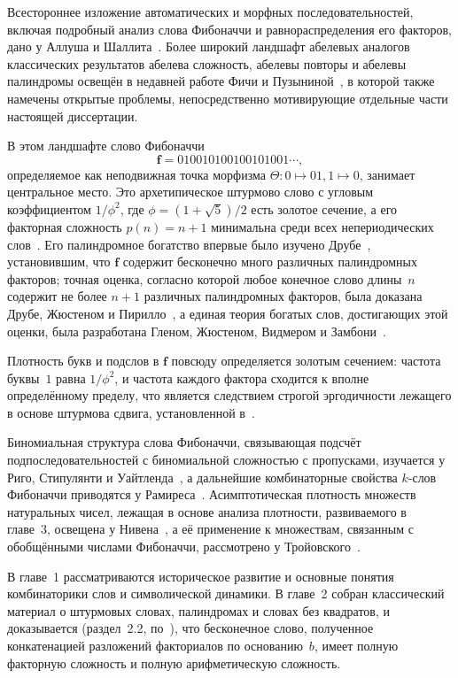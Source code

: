 \documentclass[a4paper,14pt]{extreport}
\theoremstyle{plain}
\theoremstyle{definition}
\theoremstyle{remark}
\begin{document}
	Всестороннее изложение автоматических и морфных последовательностей, включая подробный анализ слова Фибоначчи и равнораспределения его факторов, дано у Аллуша и Шаллита~\cite{Allouche}. Более широкий ландшафт абелевых аналогов
	классических результатов абелева сложность, абелевы повторы и абелевы палиндромы освещён в недавней работе Фичи и Пузыниной~\cite{Fici2023}, в которой также намечены открытые проблемы, непосредственно мотивирующие отдельные части настоящей диссертации.
	
	В этом ландшафте слово Фибоначчи
	\begin{equation}
		\mathbf{f}=0 1 0 0 1 0 1 0 0 1 0 0 1 0 1 0 0 1\cdots,
	\end{equation}
	определяемое как неподвижная точка морфизма $\Theta\colon 0\mapsto 01,
	1\mapsto 0$, занимает центральное место. Это архетипическое штурмово слово с угловым коэффициентом $1/\phi^{2}$, где $\phi=(1+\sqrt{5})/2$ есть золотое сечение, а его факторная сложность $p(n)=n+1$ минимальна среди всех непериодических слов~\cite{Morse1940}. Его палиндромное богатство впервые было изучено Друбе~\cite{Droubay1995}, установившим, что $\mathbf{f}$ содержит бесконечно много различных палиндромных факторов; точная оценка, согласно которой любое конечное слово длины~$n$ содержит не более $n+1$ различных палиндромных факторов, была доказана Друбе, Жюстеном и Пирилло~\cite{Droubay,Justin}, а единая теория богатых слов, достигающих этой оценки, была разработана Гленом, Жюстеном, Видмером и Замбони~\cite{Glen2009}. 
	
	Плотность букв и подслов в $\mathbf{f}$ повсюду определяется золотым сечением: частота буквы~$1$ равна $1/\phi^{2}$, и частота каждого фактора сходится к вполне определённому пределу, что является следствием строгой эргодичности лежащего в основе штурмова сдвига, установленной в~\cite{Fogg, Allouche}. 
	
	Биномиальная структура слова Фибоначчи, связывающая подсчёт подпоследовательностей с биномиальной сложностью с пропусками, изучается у Риго, Стипулянти и Уайтленда~\cite{Rigo2023}, а дальнейшие комбинаторные свойства $k$-слов Фибоначчи приводятся у Рамиреса~\cite{Ramirez}. Асимптотическая плотность множеств натуральных чисел, лежащая в основе анализа плотности, развиваемого в главе~3, освещена у Нивена~\cite{Niven}, а её применение к множествам, связанным с обобщёнными числами Фибоначчи, рассмотрено у Тройовского~\cite{Trojovsky}.
	
	В главе~1 рассматриваются историческое развитие и основные понятия комбинаторики слов и символической динамики. В главе~2 собран классический материал о штурмовых словах, палиндромах и словах без квадратов,
	и доказывается (раздел~2.2, по~\cite{Duaa23}), что бесконечное слово, полученное конкатенацией разложений факториалов по основанию~$b$, имеет полную факторную сложность и полную арифметическую сложность.
	
\end{document}
